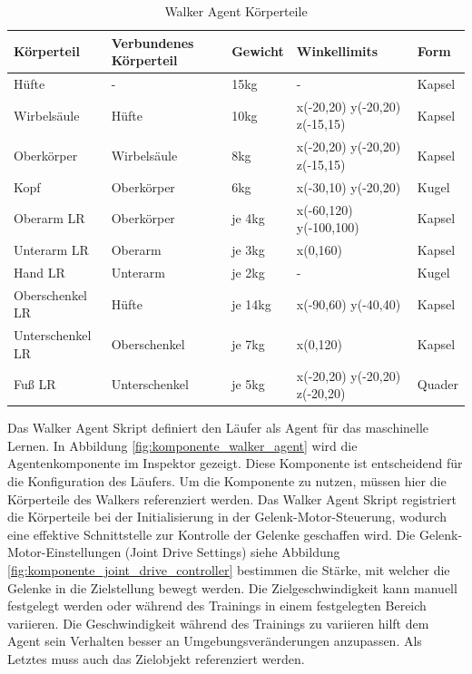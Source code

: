 \begin{table}[H]
  \centering
  {
  \begin{tabular}{ |p{3cm}|p{3cm}|p{2cm}|p{4cm}|p{2cm}| }
  \hline
  \textbf{Körpertei}l& \textbf{Verbundenes Körperteil} & \textbf{Gewicht} & \textbf{Winkellimits} & \textbf{Form} \\
  \hline
  Hüfte & - & 15kg & - & Kapsel \\
  \hline
  Wirbelsäule & Hüfte & 10kg & x(-20,20) y(-20,20) z(-15,15) & Kapsel \\
  \hline
  Oberkörper & Wirbelsäule & 8kg & x(-20,20) y(-20,20) z(-15,15) & Kapsel \\
  \hline
  Kopf & Oberkörper & 6kg & x(-30,10) y(-20,20) & Kugel \\
  \hline
  Oberarm LR & Oberkörper & je 4kg & x(-60,120) y(-100,100) & Kapsel \\
  \hline
  Unterarm LR & Oberarm & je 3kg & x(0,160) & Kapsel \\
  \hline
  Hand LR & Unterarm & je 2kg & - & Kugel \\
  \hline
  Oberschenkel LR & Hüfte & je 14kg& x(-90,60) y(-40,40) & Kapsel \\
  \hline
  Unterschenkel LR & Oberschenkel & je 7kg &  x(0,120) & Kapsel \\
  \hline
  Fuß LR & Unterschenkel & je 5kg & x(-20,20) y(-20,20) z(-20,20) & Quader \\
  \hline
  \end{tabular}}
  \caption{Walker Agent Körperteile}
  \label{table:walker_körperteile}
\end{table}

Das Walker Agent Skript definiert den Läufer als Agent für das maschinelle Lernen. In Abbildung \ref{fig:komponente_walker_agent} wird die Agentenkomponente im Inspektor gezeigt. Diese Komponente ist entscheidend für die Konfiguration des Läufers. Um die Komponente zu nutzen, müssen hier die Körperteile des Walkers referenziert werden. Das Walker Agent Skript registriert die Körperteile bei der Initialisierung in der Gelenk-Motor-Steuerung, wodurch eine effektive Schnittstelle zur Kontrolle der Gelenke geschaffen wird. Die Gelenk-Motor-Einstellungen (Joint Drive Settings) siehe Abbildung \ref{fig:komponente_joint_drive_controller} bestimmen die Stärke, mit welcher die Gelenke in die Zielstellung bewegt werden. Die Zielgeschwindigkeit kann manuell festgelegt werden oder während des Trainings in einem festgelegten Bereich variieren. Die Geschwindigkeit während des Trainings zu variieren hilft dem Agent sein Verhalten besser an Umgebungsveränderungen anzupassen. Als Letztes muss auch das Zielobjekt referenziert werden.

